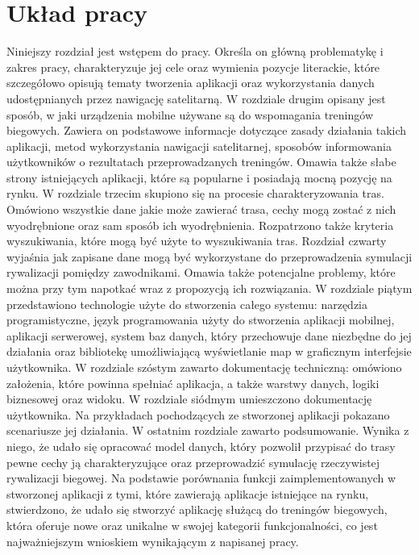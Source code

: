 \section{Układ pracy}
Niniejszy rozdział jest wstępem do pracy. Określa on główną problematykę i zakres pracy, charakteryzuje jej cele oraz wymienia pozycje literackie, które szczegółowo opisują tematy tworzenia aplikacji oraz wykorzystania danych udostępnianych przez nawigację satelitarną. W rozdziale drugim opisany jest sposób, w jaki urządzenia mobilne używane są do wspomagania treningów biegowych. Zawiera on podstawowe informacje dotyczące zasady działania takich aplikacji, metod wykorzystania nawigacji satelitarnej, sposobów informowania użytkowników o rezultatach przeprowadzanych treningów. Omawia także słabe strony istniejących aplikacji, które są popularne i posiadają mocną pozycję na rynku. W rozdziale trzecim skupiono się na procesie charakteryzowania tras. Omówiono wszystkie dane jakie może zawierać trasa,  cechy mogą zostać z nich wyodrębnione oraz sam sposób ich wyodrębnienia. Rozpatrzono także kryteria wyszukiwania, które mogą być użyte to wyszukiwania tras. Rozdział czwarty wyjaśnia jak zapisane dane mogą być wykorzystane do przeprowadzenia symulacji rywalizacji pomiędzy zawodnikami. Omawia także potencjalne problemy, które można przy tym napotkać wraz z propozycją ich rozwiązania. W rozdziale piątym przedstawiono technologie użyte do stworzenia całego systemu: narzędzia programistyczne, język programowania użyty do stworzenia aplikacji mobilnej, aplikacji serwerowej, system baz danych, który przechowuje dane niezbędne do jej działania oraz bibliotekę umożliwiającą wyświetlanie map w graficznym interfejsie użytkownika. W rozdziale szóstym zawarto dokumentację techniczną: omówiono założenia, które powinna spełniać aplikacja, a także warstwy danych, logiki biznesowej oraz widoku. W rozdziale siódmym umieszczono dokumentację użytkownika. Na przykładach pochodzących ze stworzonej aplikacji pokazano scenariusze jej działania. W ostatnim rozdziale zawarto podsumowanie. Wynika z niego, że udało się opracować model danych, który pozwolił przypisać do trasy pewne cechy ją charakteryzujące oraz przeprowadzić symulację rzeczywistej rywalizacji biegowej. Na podstawie porównania funkcji zaimplementowanych w stworzonej aplikacji z tymi, które zawierają aplikacje istniejące na rynku, stwierdzono, że udało się stworzyć aplikację służącą do treningów biegowych, która oferuje nowe oraz unikalne w swojej kategorii funkcjonalności, co jest najważniejszym wnioskiem wynikającym z napisanej pracy.